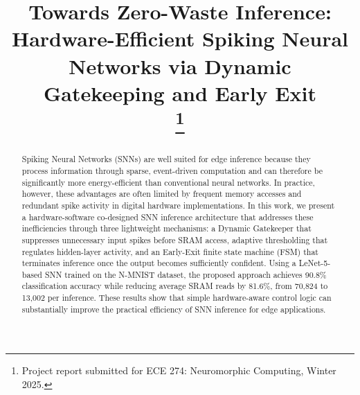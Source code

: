 \documentclass[conference]{IEEEtran}
\begin{document}
\title{Towards Zero-Waste Inference: Hardware-Efficient Spiking Neural Networks via Dynamic Gatekeeping and Early Exit\\
\thanks{Project report submitted for ECE 274: Neuromorphic Computing, Winter 2025.}
}

\author{
\and
{}
}

\maketitle

\begin{abstract}
Spiking Neural Networks (SNNs) are well suited for edge inference because they process information through sparse, event-driven computation and can therefore be significantly more energy-efficient than conventional neural networks. In practice, however, these advantages are often limited by frequent memory accesses and redundant spike activity in digital hardware implementations. In this work, we present a hardware-software co-designed SNN inference architecture that addresses these inefficiencies through three lightweight mechanisms: a Dynamic Gatekeeper that suppresses unnecessary input spikes before SRAM access, adaptive thresholding that regulates hidden-layer activity, and an Early-Exit finite state machine (FSM) that terminates inference once the output becomes sufficiently confident. Using a LeNet-5-based SNN trained on the N-MNIST dataset, the proposed approach achieves 90.8\% classification accuracy while reducing average SRAM reads by 81.6\%, from 70,824 to 13,002 per inference. These results show that simple hardware-aware control logic can substantially improve the practical efficiency of SNN inference for edge applications.
\end{abstract}
\end{document}
